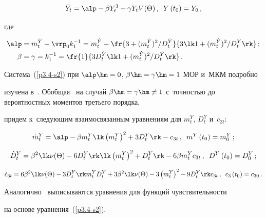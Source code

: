 {\begin{equation}
\dot Y_t = \alp - \beta Y_t^3 + \gamma Y_t V(\Theta)\,, \enskip 

Y\left(t_0\right) = Y_0\,, \label{p3.4-s2}

\end{equation}

где

   \begin{align*}

    \alp&= m_t^{\dot Y} - \vrp_0 k_1^{-1} = m_t^{\dot Y} - 

    \fr{3+( m_t^{\dot Y})^2/ D_t^{\dot Y}}{3 \lk 1+( m_t^{\dot Y})^2/ D_t^{\dot Y}\rk}\,;

   \\

    \beta&= \gamma=k_1^{-1}=  \fr{1}{3 D_t^{\dot Y}\lk 1+( m_t^{\dot Y})^2/ 

    D_t^{\dot Y}\rk}\,.


\end{align*}



Система~(\ref{p3.4-s2}) при $\alp\hm=0$, $\beta\hm=\gamma\hm=1$ МОР и~МКМ подробно 

изучена в~\cite{9-s2, 10-s2}. Обобщая~\cite{9-s2, 10-s2} на случай $\beta\hm= 

\gamma \hm\ne 1$ с~точностью до вероятностных моментов третьего порядка, 

придем к~следующим взаимосвязанным уравнениям для $m_t^Y$, $D_t^Y$ и~$c_{3t}$:

    $$

    \dot m^Y_t = \alp - \beta m_t^Y \lk \left(m_t^Y\right)^2 +3D_t^Y\rk - c_{3t}\,, 

    \enskip m^Y \left(t_0\right) = m_0^Y\,; 


    $$

    $$

    \dot D_t^Y = \beta^2 \lk \nu(\Theta) - 6 D_t^Y\rk \lk \left(m_t^Y\right)^2 + 

    D_t^Y\rk - 6\beta m_t^Y c_{3t}\,, \enskip D^Y \left(t_0\right) = D_0^Y\,;


    $$

    $$

    \dot c_{3t} = 6\beta^2 \lk \nu(\Theta) - 3 D_t^Y\rk m_t^Y D_t^Y + 

    3 \beta^2 \lk \nu(\Theta) - 3 \left(m_t^Y\right)^2 - 9 D_t^Y\rk c_{3t}\,,\enskip 

    c_3\left(t_0\right) = c_{30}\,.


    $$



Аналогично~\cite{9-s2, 10-s2} выписываются уравнения для функций чувствительности 

на основе уравнения~(\ref{p3.4-s2}).



}



